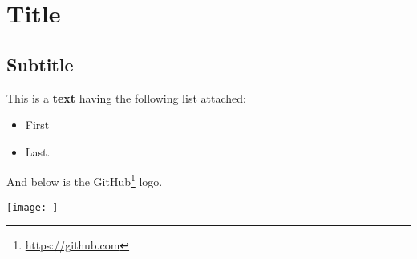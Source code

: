 \section{Title}

\subsection{Subtitle}

This is a \textbf{text} having the following list attached:
\begin{itemize}
    \item First
    \item Last.
\end{itemize}

And below is the GitHub\footnote{\href{https://github.com}{https://github.com}} logo.

\vspace{0.3cm}
\begin{center}
    \texttt{[image: ]}
    \label{fig:1}
    \captionsetup{justification=centering,margin=1cm}
\end{center}
\vspace{0.3cm}